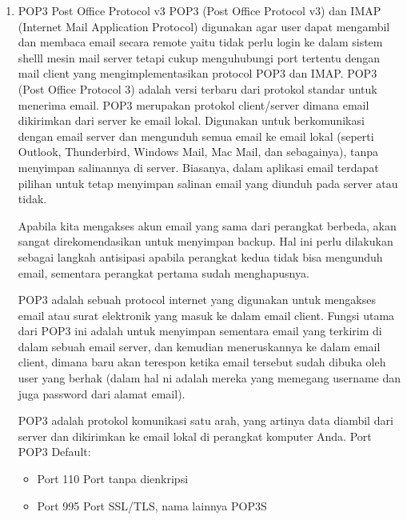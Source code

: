 \begin{enumerate}
		\item {POP3 Post Office Protocol v3}
			POP3 (Post Office Protocol v3) dan IMAP (Internet Mail Application Protocol) digunakan agar user dapat mengambil dan membaca email secara remote yaitu tidak perlu login ke dalam sistem shelll mesin mail server tetapi cukup menguhubungi port tertentu dengan mail client yang mengimplementasikan protocol POP3 dan IMAP.
			POP3 (Post Office Protocol 3) adalah versi terbaru dari protokol standar untuk menerima email. POP3 merupakan protokol client/server dimana email dikirimkan dari server ke email lokal. Digunakan untuk berkomunikasi dengan email server dan mengunduh semua email ke email lokal (seperti Outlook, Thunderbird, Windows Mail, Mac Mail, dan sebagainya), tanpa menyimpan salinannya di server. Biasanya, dalam aplikasi email terdapat pilihan untuk tetap menyimpan salinan email yang diunduh pada server atau tidak.

			Apabila kita mengakses akun email yang sama dari perangkat berbeda, akan sangat direkomendasikan untuk menyimpan backup. Hal ini perlu dilakukan sebagai langkah antisipasi apabila perangkat kedua tidak bisa mengunduh email, sementara perangkat pertama sudah menghapusnya.\par \vspace{12pt} 

			POP3 adalah sebuah protocol internet yang digunakan untuk mengakses email atau surat elektronik yang masuk ke dalam email client. Fungsi utama dari POP3 ini adalah untuk menyimpan sementara email yang terkirim di dalam sebuah email server, dan kemudian meneruskannya ke dalam email client, dimana baru akan terespon ketika email tersebut sudah dibuka oleh user yang berhak (dalam hal ni adalah mereka yang memegang username dan juga password dari alamat email).
			\par \vspace{12pt}
			
			POP3 adalah protokol komunikasi satu arah, yang artinya data diambil dari server dan dikirimkan ke email lokal di perangkat komputer Anda. 
Port POP3 Default:
			\begin{itemize}
			\item Port 110 Port tanpa dienkripsi
			\item Port 995 Port SSL/TLS, nama lainnya POP3S
			\end{itemize}
	\end{enumerate}

